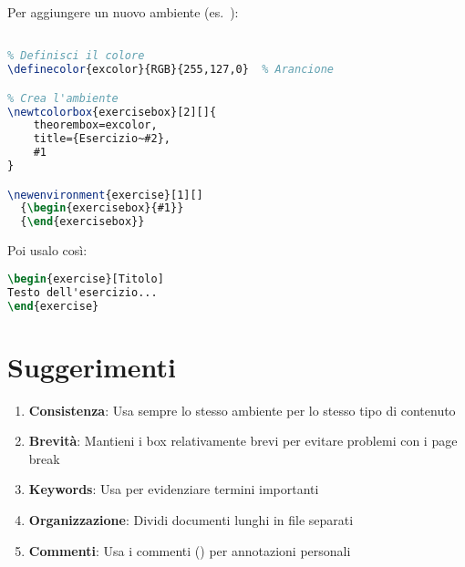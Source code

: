 \documentclass{csnotes}
\begin{document}
\begin{example}
Per aggiungere un nuovo ambiente (es.\ ):
\begin{lstlisting}[language=TeX]
% Nel file csnotes.cls, dopo gli altri ambienti

% Definisci il colore
\definecolor{excolor}{RGB}{255,127,0}  % Arancione

% Crea l'ambiente
\newtcolorbox{exercisebox}[2][]{
    theorembox=excolor,
    title={Esercizio~#2},
    #1
}

\newenvironment{exercise}[1][]
  {\begin{exercisebox}{#1}}
  {\end{exercisebox}}
\end{lstlisting}

Poi usalo così:
\begin{lstlisting}[language=TeX]
\begin{exercise}[Titolo]
Testo dell'esercizio...
\end{exercise}
\end{lstlisting}
\end{example}


\section{Suggerimenti}

\begin{note}
\begin{enumerate}
    \item \textbf{Consistenza}: Usa sempre lo stesso ambiente per lo stesso 
    tipo di contenuto
    \item \textbf{Brevità}: Mantieni i box relativamente brevi per evitare 
    problemi con i page break
    \item \textbf{Keywords}: Usa  per 
    evidenziare termini importanti
    \item \textbf{Organizzazione}: Dividi documenti lunghi in file separati
    \item \textbf{Commenti}: Usa i commenti (\code{\%}) per annotazioni personali
\end{enumerate}
\end{note}
\end{document}
